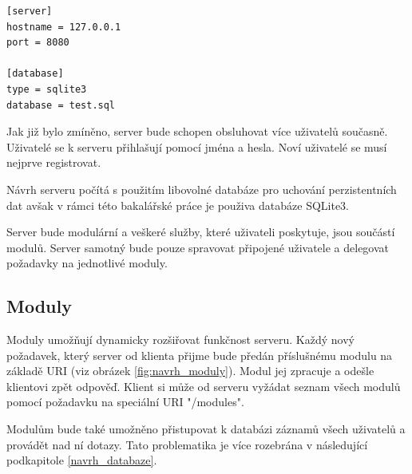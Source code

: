 \begin{verbatim}
[server]
hostname = 127.0.0.1
port = 8080

[database]
type = sqlite3
database = test.sql
\end{verbatim}
 
Jak již bylo zmíněno, server bude schopen obsluhovat více uživatelů současně.
Uživatelé se k serveru přihlašují pomocí jména a hesla. Noví uživatelé se musí nejprve registrovat.

Návrh serveru počítá s použitím libovolné databáze pro uchování perzistentních dat avšak v rámci této bakalářské
práce je použiva databáze SQLite3.

Server bude modulární a veškeré služby, které uživateli poskytuje, jsou součástí modulů. Server samotný bude pouze spravovat
připojené uživatele a delegovat požadavky na jednotlivé moduly.

\subsection{Moduly}
\label{navrh_moduly}

Moduly umožňují dynamicky rozšiřovat funkčnost serveru. Každý nový požadavek, který server od klienta přijme bude
předán příslušnému modulu na základě URI (viz obrázek \ref{fig:navrh_moduly}).
Modul jej zpracuje a odešle klientovi zpět odpověď. Klient si může
od serveru vyžádat seznam všech modulů pomocí požadavku na speciální URI "/modules".

Modulům bude také umožněno přistupovat k databázi záznamů všech uživatelů a provádět nad ní dotazy. Tato problematika je více
rozebrána v následující podkapitole \ref{navrh_databaze}.

